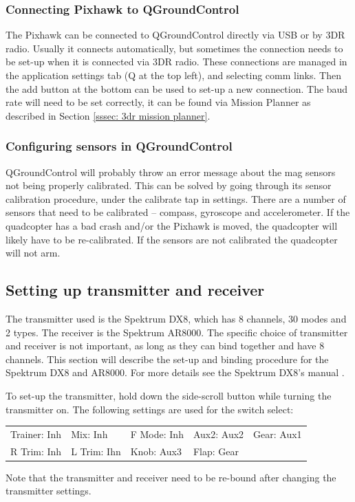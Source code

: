\documentclass[12pt,a4paper]{article}
\begin{document}
    \subsubsection{Connecting Pixhawk to QGroundControl} 
      The Pixhawk can be connected to QGroundControl directly via USB or by 3DR radio. Usually it connects automatically, but sometimes the connection needs to be set-up when it is connected via 3DR radio. These connections are managed in the application settings tab (Q at the top left), and selecting comm links. Then the add button at the bottom can be used to set-up a new connection. The baud rate will need to be set correctly, it can be found via Mission Planner as described in Section \ref{sssec: 3dr mission planner}.

    \subsubsection{Configuring sensors in QGroundControl} 
      QGroundControl will probably throw an error message about the mag sensors not being properly calibrated. This can be solved by going through its sensor calibration procedure, under the calibrate tap in settings. There are a number of sensors that need to be calibrated -- compass, gyroscope and accelerometer. If the quadcopter has a bad crash and/or the Pixhawk is moved, the quadcopter will likely have to be re-calibrated. If the sensors are not calibrated the quadcopter will not arm.


  \subsection{Setting up transmitter and receiver}
    \label{a: t and r}
    The transmitter used is the Spektrum DX8, which has 8 channels, 30 modes and 2 types. The receiver is the Spektrum AR8000. The specific choice of transmitter and receiver is not important, as long as they can bind together and have 8 channels. This section will describe the set-up and binding procedure for the Spektrum DX8 and AR8000. For more details see the Spektrum DX8's manual \cite{spektrum}.
     
    To set-up the transmitter, hold down the side-scroll button while turning the transmitter on. The following settings are used for the switch select: 
    \begin{center}
    \begin{tabular}{ l l l l l }
    Trainer: Inh & Mix: Inh & F Mode: Inh & Aux2: Aux2 & Gear: Aux1 \\
    R Trim: Inh & L Trim: Ihn & Knob: Aux3 & Flap: Gear & \\
    \end{tabular}
    \end{center}
    Note that the transmitter and receiver need to be re-bound after changing the transmitter settings.
     
\end{document}
